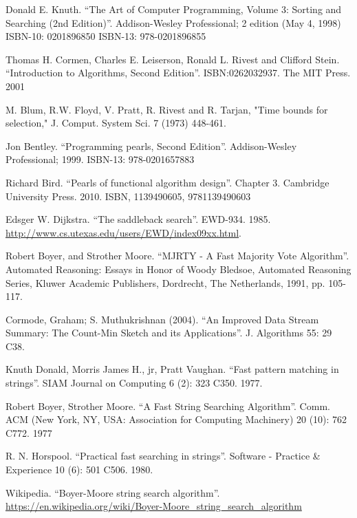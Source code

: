 \documentclass[b5paper]{article}
\begin{document}
\begin{thebibliography}{99}

Donald E. Knuth. ``The Art of Computer Programming, Volume 3: Sorting and Searching (2nd Edition)''. Addison-Wesley Professional; 2 edition (May 4, 1998) ISBN-10: 0201896850 ISBN-13: 978-0201896855

Thomas H. Cormen, Charles E. Leiserson, Ronald L. Rivest and Clifford Stein.
``Introduction to Algorithms, Second Edition''. ISBN:0262032937. The MIT Press. 2001

M. Blum, R.W. Floyd, V. Pratt, R. Rivest and R. Tarjan, "Time bounds for selection," J. Comput. System Sci. 7 (1973) 448-461.

Jon Bentley. ``Programming pearls, Second Edition''. Addison-Wesley Professional; 1999. ISBN-13: 978-0201657883

Richard Bird. ``Pearls of functional algorithm design''. Chapter 3. Cambridge University Press. 2010. ISBN, 1139490605, 9781139490603

Edsger W. Dijkstra. ``The saddleback search''. EWD-934. 1985. \url{http://www.cs.utexas.edu/users/EWD/index09xx.html}.

Robert Boyer, and Strother Moore. ``MJRTY - A Fast Majority Vote Algorithm''. Automated Reasoning: Essays in Honor of Woody Bledsoe, Automated Reasoning Series, Kluwer Academic Publishers, Dordrecht, The Netherlands, 1991, pp. 105-117.

Cormode, Graham; S. Muthukrishnan (2004). ``An Improved Data Stream Summary: The Count-Min Sketch and its Applications''. J. Algorithms 55: 29 C38.

Knuth Donald, Morris James H., jr, Pratt Vaughan. ``Fast pattern matching in strings''. SIAM Journal on Computing 6 (2): 323 C350. 1977.

Robert Boyer, Strother Moore. ``A Fast String Searching Algorithm''. Comm. ACM (New York, NY, USA: Association for Computing Machinery) 20 (10): 762 C772. 1977

R. N. Horspool. ``Practical fast searching in strings''. Software - Practice \& Experience 10 (6): 501 C506. 1980.

Wikipedia. ``Boyer-Moore string search algorithm''. \url{https://en.wikipedia.org/wiki/Boyer-Moore_string_search_algorithm}


\end{thebibliography}
\end{document}
